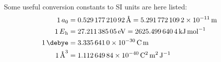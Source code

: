 Some useful conversion constants to SI units are here
listed:~\autocite{Mohr2012-zc}
\begin{subequations}
 \begin{align*}
  \SI{1}{\bohr} &= \SI{0.52917721092}{\angstrom} = \SI{5.2917721092e-11}{\meter} \\
  \SI{1}{\hartree} &= \SI{27.21138505}{\electronvolt} = \SI{2625.4996404}{\kilo\joule\per\mole} \\
  \SI{1}{\debye} &= \SI{3.3356410E-30}{\coulomb\meter} \\
  \SI{1}{\angstrom\cubed} &= \SI{1.11264984E-40}{\coulomb\squared\meter\squared\per\joule}
 \end{align*}
\end{subequations}
